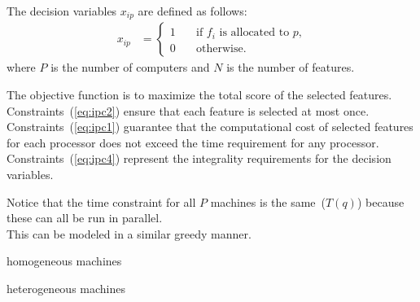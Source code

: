 \documentclass[10pt, conference, compsocconf]{IEEEtran}
\begin{document}
The decision variables $x_{ip}$ are defined as follows:
\begin{align} x_{ip} &=
\begin{cases} 
1 & \quad \text{if $f_i$ is allocated to $p$,}\\
0 & \quad \text{otherwise.}
\end{cases} 
\end{align} 
where $P$ is the number of computers and $N$ is the number of features. 

The objective function is to maximize the total score of the selected features. 
Constraints~(\ref{eq:ipc2}) ensure that each feature is selected at most once. 
Constraints~(\ref{eq:ipc1}) guarantee that 
the computational cost of selected features for each processor does 
not exceed the time requirement for any processor.
Constraints~(\ref{eq:ipc4}) 
represent the integrality requirements for the decision variables. 

Notice that the time constraint for all $P$ machines is the same~($T(q)$) because these can all be run in parallel.\\
This can be modeled in a similar greedy manner.

homogeneous machines

heterogeneous machines


{\tiny
\newcommand{\BIBdecl}{\setlength{\itemsep}{0.2 em}}


}

\end{document}
